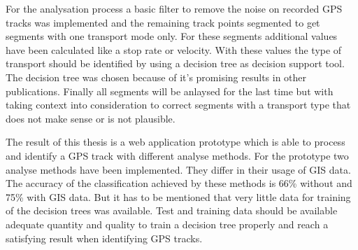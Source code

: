 For the analysation process a basic filter to remove the noise on recorded GPS tracks was implemented and the remaining track points segmented to get segments with one transport mode only. For these segments additional values have been calculated like a stop rate or velocity. With these values the type of transport should be identified by using a decision tree as decision support tool. The decision tree was chosen because of it's promising results in other publications. Finally all segments will be anlaysed for the last time but with taking context into consideration to correct segments with a transport type that does not make sense or is not plausible.

The result of this thesis is a web application prototype which is able to process and identify a GPS track with different analyse methods. For the prototype two analyse methods have been implemented. They differ in their usage of GIS data. The accuracy of the classification achieved by these methods is 66\% without and 75\% with GIS data. But it has to be mentioned that very little data for training of the decision trees was available. Test and training data should be available adequate quantity and quality to train a decision tree properly and reach a satisfying result when identifying GPS tracks.

\afterpage{\blankpage}
\newpage